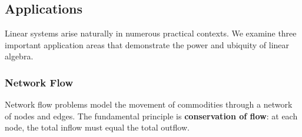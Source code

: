 \documentclass[12pt]{article}
\numberwithin{equation}{section}
\theoremstyle{plain}
\theoremstyle{definition}
\theoremstyle{remark}
\begin{document}
\subsection{Applications}

Linear systems arise naturally in numerous practical contexts. We examine three important application areas that demonstrate the power and ubiquity of linear algebra.

\subsubsection{Network Flow}

Network flow problems model the movement of commodities through a network of nodes and edges. The fundamental principle is \textbf{conservation of flow}: at each node, the total inflow must equal the total outflow.
\end{document}
